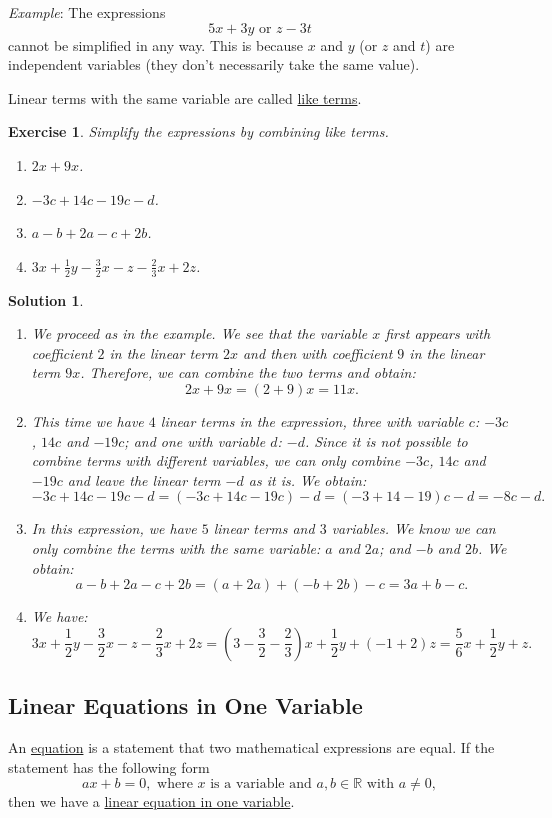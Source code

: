 \documentclass[12pt]{article}
\newtheorem{ex}{Exercise}[section]
\newtheorem{sol}[prop]{Solution}
\begin{document}
\textit{Example}: The expressions
$$5x + 3y \text{ or } z - 3t$$
cannot be simplified in any way. This is because $x$ and $y$ (or $z$ and $t$) are independent variables (they don't necessarily take the same value).

Linear terms with the same variable are called \underline{like terms}.

\begin{ex}
Simplify the expressions by combining like terms.
\begin{multicols}{2}
\begin{enumerate}
\item[a)] $2x+9x$.
\item[b)] $-3c + 14c - 19c - d$.
\item[c)] $a - b + 2a - c + 2b$.
\item[d)] $3x +\frac{1}{2}y -\frac{3}{2}x - z -\frac{2}{3}x + 2z$.
\end{enumerate}
\end{multicols}
\end{ex}

\begin{sol}
\begin{enumerate}
\item[a)] We proceed as in the example. We see that the variable $x$ first appears with coefficient $2$ in the linear term $2x$ and then with coefficient $9$ in the linear term $9x$. Therefore, we can combine the two terms and obtain:
$$2x+9x=(2+9)x=11x.$$
\item[b)] This time we have $4$ linear terms in the expression, three with variable $c$: $-3c$, $14c$ and $-19c$; and one with variable $d$: $-d$. Since it is not possible to combine terms with different variables, we can only combine $-3c$, $14c$ and $-19c$ and leave the linear term $-d$ as it is. We obtain:
$$-3c + 14c - 19c - d=(-3c+14c-19c)-d=(-3+14-19)c-d=-8c-d.$$
\item[c)] In this expression, we have $5$ linear terms and $3$ variables. We know we can only combine the terms with the same variable: $a$ and $2a$; and $-b$ and $2b$. We obtain:
 $$a - b + 2a - c + 2b=(a+2a)+(-b+2b)-c=3a+b-c.$$
\item[d)] We have:
$$3x +\frac{1}{2}y -\frac{3}{2}x - z -\frac{2}{3}x + 2z=(3-\frac{3}{2}-\frac{2}{3})x+\frac{1}{2}y+(-1+2)z=\frac{5}{6}x+\frac{1}{2}y + z.$$
\end{enumerate}
\end{sol}

\subsection{Linear Equations in One Variable}
An \underline{equation} is a statement that two mathematical expressions are equal. If the statement has the following form
$$ax+b=0, \text{ where } x \text{ is a variable and } a, b\in \mathbb{R} \text{ with }a\neq 0,$$
then we have a \underline{linear equation in one variable}. 
\end{document}
